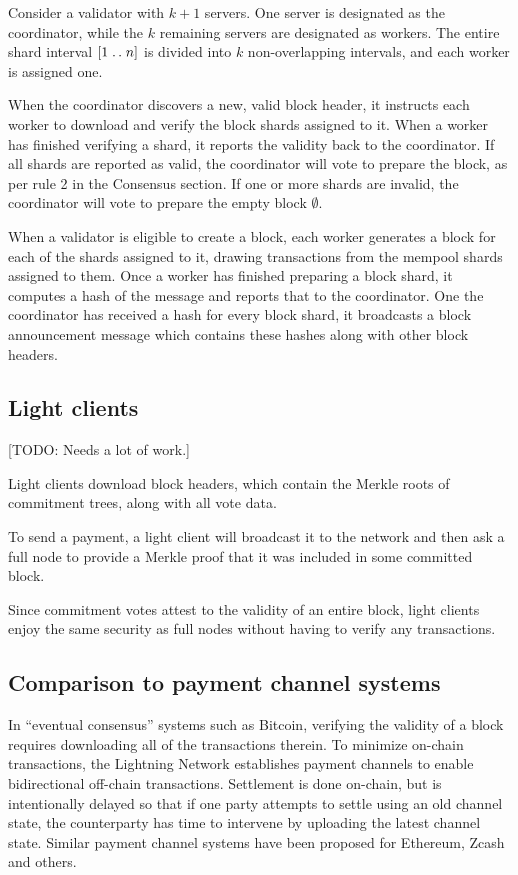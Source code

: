 Consider a validator with $k + 1$ servers. One server is designated as the coordinator, while the $k$ remaining servers are designated as workers. The entire shard interval $[1 \mathrel{{.}\,{.}}\nobreak n]$ is divided into $k$ non-overlapping intervals, and each worker is assigned one.

When the coordinator discovers a new, valid block header, it instructs each worker to download and verify the block shards assigned to it. When a worker has finished verifying a shard, it reports the validity back to the coordinator. If all shards are reported as valid, the coordinator will vote to prepare the block, as per rule 2 in the Consensus section. If one or more shards are invalid, the coordinator will vote to prepare the empty block $\emptyset$.

When a validator is eligible to create a block, each worker generates a block for each of the shards assigned to it, drawing transactions from the mempool shards assigned to them. Once a worker has finished preparing a block shard, it computes a hash of the message and reports that to the coordinator. One the coordinator has received a hash for every block shard, it broadcasts a block announcement message which contains these hashes along with other block headers.


\subsection{Light clients}

[TODO: Needs a lot of work.]

Light clients download block headers, which contain the Merkle roots of commitment trees, along with all vote data.

To send a payment, a light client will broadcast it to the network and then ask a full node to provide a Merkle proof that it was included in some committed block.


Since commitment votes attest to the validity of an entire block, light clients enjoy the same security as full nodes without having to verify any transactions.


\subsection{Comparison to payment channel systems}

In ``eventual consensus'' systems such as Bitcoin, verifying the validity of a block requires downloading all of the transactions therein. To minimize on-chain transactions, the Lightning Network \cite{poon2015bitcoin} establishes payment channels to enable bidirectional off-chain transactions. Settlement is done on-chain, but is intentionally delayed so that if one party attempts to settle using an old channel state, the counterparty has time to intervene by uploading the latest channel state. Similar payment channel systems have been proposed for Ethereum, Zcash and others.

